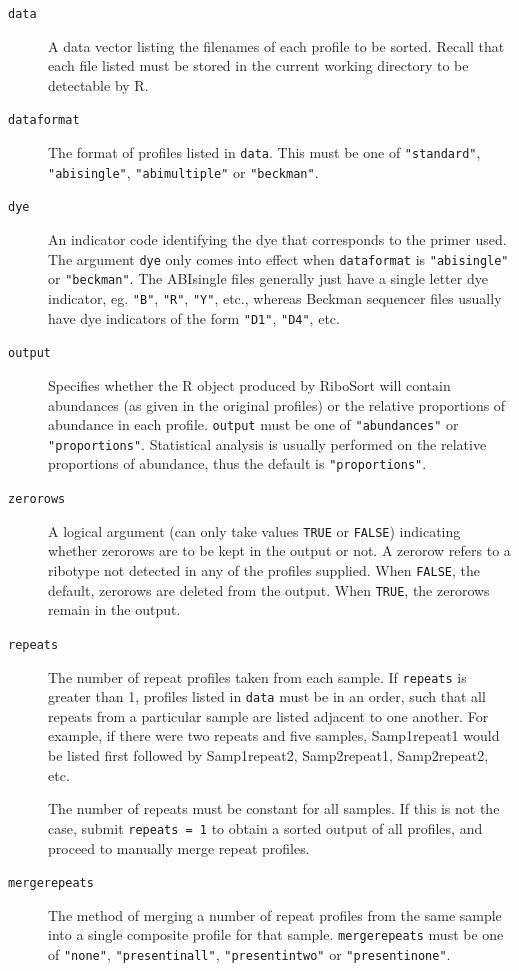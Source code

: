 \documentclass[a4paper]{article}
\begin{document}
\begin{description}
  \item[\texttt{data}] A data vector listing the filenames of each profile to be sorted. Recall that each file listed must be stored in the current working directory to be detectable by R.
  \item[\texttt{dataformat}] The format of profiles listed in \texttt{data}. This must be one of \texttt{"standard"},  \texttt{"abisingle"}, \texttt{"abimultiple"} or \texttt{"beckman"}.
  \item[\texttt{dye}] An indicator code identifying the dye that corresponds to the primer used. The argument \texttt{dye} only comes into effect when \texttt{dataformat} is \texttt{"abisingle"} or \texttt{"beckman"}. The ABIsingle files generally just have a single letter dye indicator, eg. \texttt{"B"}, \texttt{"R"}, \texttt{"Y"}, etc., whereas Beckman sequencer files usually have dye indicators of the form \texttt{"D1"}, \texttt{"D4"}, etc.
  \item[\texttt{output}] Specifies whether the R object produced by RiboSort will contain abundances (as given in the original profiles) or the relative proportions of abundance in each profile. \texttt{output} must be one of \texttt{"abundances"} or \texttt{"proportions"}. Statistical analysis is usually performed on the relative proportions of abundance, thus the default is \texttt{"proportions"}. 
  \item[\texttt{zerorows}] A logical argument (can only take values \texttt{TRUE} or \texttt{FALSE}) indicating whether zerorows are to be kept in the output or not. A zerorow refers to a ribotype not detected in any of the profiles supplied. When \texttt{FALSE}, the default, zerorows are deleted from the output. When \texttt{TRUE}, the zerorows remain in the output.
  \item[\texttt{repeats}] The number of repeat profiles taken from each sample. If \texttt{repeats} is greater than 1, profiles listed in \texttt{data} must be in an order, such that all repeats from a particular sample are listed adjacent to one another. For example, if there were two repeats and five samples, Samp1repeat1 would be listed first followed by Samp1repeat2, Samp2repeat1, Samp2repeat2, etc.
  
The number of repeats must be constant for all samples. If this is not the case, submit \texttt{repeats = 1} to obtain a sorted output of all profiles, and proceed to manually merge repeat profiles.
  \item[\texttt{mergerepeats}] The method of merging a number of repeat profiles from the same sample into a single composite profile for that sample. \texttt{mergerepeats} must be one of \texttt{"none"}, \texttt{"presentinall"}, \texttt{"presentintwo"} or \texttt{"presentinone"}.
  

\end{description}
\end{document}
